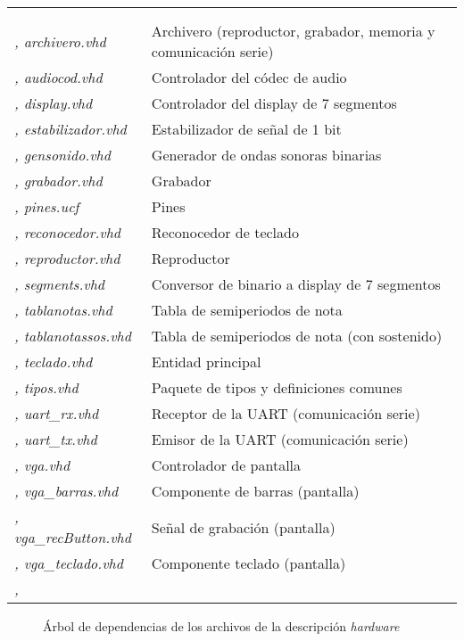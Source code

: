 \documentclass{article}
\begin{document}
\begin{tabu}{| >{\itshape}X[5, l] | X[14, l] |}
	 \\
	 \\ \sep
	archivero.vhd & Archivero (reproductor, grabador, memoria y comunicación serie) \\ \sep
	audiocod.vhd & Controlador del códec de audio \\ \sep
	display.vhd & Controlador del display de 7 segmentos \\ \sep
	estabilizador.vhd & Estabilizador de señal de 1 bit \\ \sep
	gensonido.vhd & Generador de ondas sonoras binarias \\ \sep
	grabador.vhd & Grabador \\ \sep
	pines.ucf & Pines \\ \sep
	reconocedor.vhd & Reconocedor de teclado \\ \sep
	reproductor.vhd & Reproductor \\ \sep
	segments.vhd & Conversor de binario a display de 7 segmentos \\ \sep
	tablanotas.vhd & Tabla de semiperiodos de nota \\ \sep
	tablanotassos.vhd & Tabla de semiperiodos de nota (con sostenido) \\ \sep
	teclado.vhd & Entidad principal \\ \sep
	tipos.vhd & Paquete de tipos y definiciones comunes \\ \sep
	uart\_rx.vhd & Receptor de la UART (comunicación serie) \\ \sep
	uart\_tx.vhd & Emisor de la UART (comunicación serie) \\ \sep
	vga.vhd & Controlador de pantalla \\ \sep
	vga\_barras.vhd & Componente de barras (pantalla) \\ \sep
	vga\_recButton.vhd & Señal de grabación (pantalla) \\ \sep
	vga\_teclado.vhd & Componente teclado (pantalla) \\ \sep
\end{tabu}

\begin{figure}[t] \centering
{}
\caption{Árbol de dependencias de los archivos de la descripción {\itshape hardware}}
\end{figure}
\end{document}
